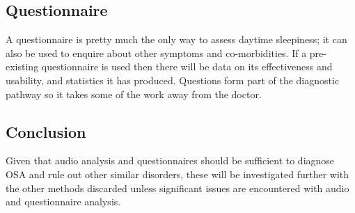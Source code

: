 \subsection{Questionnaire}
A questionnaire is pretty much the only way to assess daytime sleepiness; it can also be used to enquire about other symptoms and co-morbidities. If a pre-existing questionnaire is used then there will be data on its effectiveness and usability, and statistics it has produced. Questions form part of the diagnostic pathway so it takes some of the work away from the doctor.

\subsection{Conclusion}
Given that audio analysis and questionnaires should be sufficient to diagnose OSA and rule out other similar disorders, these will be investigated further with the other methods discarded unless significant issues are encountered with audio and questionnaire analysis. 
